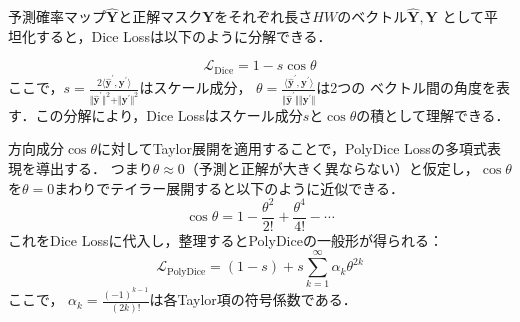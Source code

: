 \documentclass[10pt, a4paper, twocolumn]{jarticle}
\begin{document}
予測確率マップ$\hat{\mathbf{Y}}$と正解マスク$\mathbf{Y}$をそれぞれ長さ$HW$のベクトル$\hat{\mathbf{Y}}, \mathbf{Y}$
として平坦化すると，Dice Lossは以下のように分解できる．

\begin{equation}
  \mathcal{L}_{\text{Dice}} = 1 - s \cos  \theta
\end{equation}
ここで，$s = \frac{2 \langle \hat{\mathbf{y}} ^ {\prime}, {\mathbf{y}} ^ {\prime} \rangle}{\Vert \hat{\mathbf{y}} ^ {\prime} \Vert ^ 2 + \Vert {\mathbf{y}} ^ {\prime} \Vert ^ 2}$はスケール成分，
$\theta = \frac{\langle \hat{\mathbf{y}} ^ {\prime}, {\mathbf{y}} ^ {\prime} \rangle}{\Vert \hat{\mathbf{y}} ^ {\prime} \Vert \Vert {\mathbf{y}} ^ {\prime} \Vert}$は2つの
ベクトル間の角度を表す．この分解により，Dice Lossはスケール成分$s$と$\cos \theta$の積として理解できる．

方向成分$\cos \theta$に対してTaylor展開を適用することで，PolyDice Lossの多項式表現を導出する．
つまり$\theta \approx 0$（予測と正解が大きく異ならない）と仮定し，$\cos{\theta}$を$\theta = 0$まわりでテイラー展開すると以下のように近似できる．
\begin{equation}
  \cos{\theta} = 1 - \frac{\theta ^ 2}{2!} + \frac{\theta ^ 4}{4!} - \cdots
\end{equation}
これをDice Lossに代入し，整理するとPolyDiceの一般形が得られる：
\begin{equation}
  \mathcal{L}_{\text{PolyDice}} = (1 - s) + s \sum_{k = 1}^{\infty} \alpha_k \theta ^ {2k}
\end{equation}
ここで， $\alpha_k=\frac{(-1)^{k-1}}{(2k)!}$は各Taylor項の符号係数である．
\end{document}
